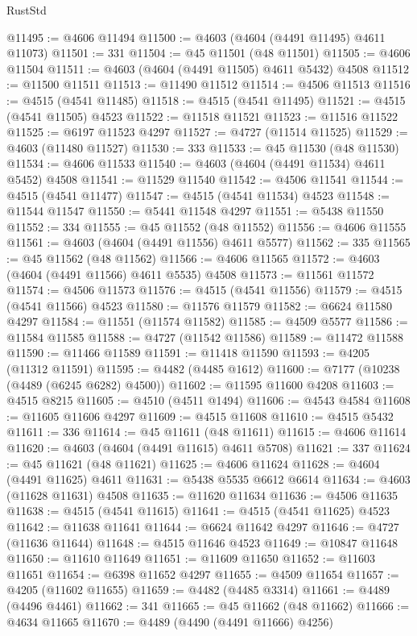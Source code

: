 \begin{lexlean}{RustStd}
\begin{coremodule}
@11495 := @4606 @11494
@11500 := @4603 (@4604 (@4491 @11495) @4611 @11073)
@11501 := 331
@11504 := @45 @11501 (@48 @11501)
@11505 := @4606 @11504
@11511 := @4603 (@4604 (@4491 @11505) @4611 @5432) @4508
@11512 := @11500 @11511
@11513 := @11490 @11512
@11514 := @4506 @11513
@11516 := @4515 (@4541 @11485)
@11518 := @4515 (@4541 @11495)
@11521 := @4515 (@4541 @11505) @4523
@11522 := @11518 @11521
@11523 := @11516 @11522
@11525 := @6197 @11523 @4297
@11527 := @4727 (@11514 @11525)
@11529 := @4603 (@11480 @11527)
@11530 := 333
@11533 := @45 @11530 (@48 @11530)
@11534 := @4606 @11533
@11540 := @4603 (@4604 (@4491 @11534) @4611 @5452) @4508
@11541 := @11529 @11540
@11542 := @4506 @11541
@11544 := @4515 (@4541 @11477)
@11547 := @4515 (@4541 @11534) @4523
@11548 := @11544 @11547
@11550 := @5441 @11548 @4297
@11551 := @5438 @11550
@11552 := 334
@11555 := @45 @11552 (@48 @11552)
@11556 := @4606 @11555
@11561 := @4603 (@4604 (@4491 @11556) @4611 @5577)
@11562 := 335
@11565 := @45 @11562 (@48 @11562)
@11566 := @4606 @11565
@11572 := @4603 (@4604 (@4491 @11566) @4611 @5535) @4508
@11573 := @11561 @11572
@11574 := @4506 @11573
@11576 := @4515 (@4541 @11556)
@11579 := @4515 (@4541 @11566) @4523
@11580 := @11576 @11579
@11582 := @6624 @11580 @4297
@11584 := @11551 (@11574 @11582)
@11585 := @4509 @5577
@11586 := @11584 @11585
@11588 := @4727 (@11542 @11586)
@11589 := @11472 @11588
@11590 := @11466 @11589
@11591 := @11418 @11590
@11593 := @4205 (@11312 @11591)
@11595 := @4482 (@4485 @1612)
@11600 := @7177 (@10238 (@4489 (@6245 @6282) @4500))
@11602 := @11595 @11600 @4208
@11603 := @4515 @8215
@11605 := @4510 (@4511 @1494)
@11606 := @4543 @4584
@11608 := @11605 @11606 @4297
@11609 := @4515 @11608
@11610 := @4515 @5432
@11611 := 336
@11614 := @45 @11611 (@48 @11611)
@11615 := @4606 @11614
@11620 := @4603 (@4604 (@4491 @11615) @4611 @5708)
@11621 := 337
@11624 := @45 @11621 (@48 @11621)
@11625 := @4606 @11624
@11628 := @4604 (@4491 @11625) @4611
@11631 := @5438 @5535 @6612 @6614
@11634 := @4603 (@11628 @11631) @4508
@11635 := @11620 @11634
@11636 := @4506 @11635
@11638 := @4515 (@4541 @11615)
@11641 := @4515 (@4541 @11625) @4523
@11642 := @11638 @11641
@11644 := @6624 @11642 @4297
@11646 := @4727 (@11636 @11644)
@11648 := @4515 @11646 @4523
@11649 := @10847 @11648
@11650 := @11610 @11649
@11651 := @11609 @11650
@11652 := @11603 @11651
@11654 := @6398 @11652 @4297
@11655 := @4509 @11654
@11657 := @4205 (@11602 @11655)
@11659 := @4482 (@4485 @3314)
@11661 := @4489 (@4496 @4461)
@11662 := 341
@11665 := @45 @11662 (@48 @11662)
@11666 := @4634 @11665
@11670 := @4489 (@4490 (@4491 @11666) @4256)

\end{coremodule}
\end{lexlean}
